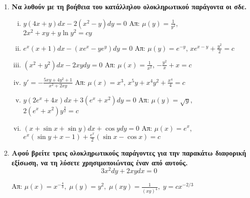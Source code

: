 \begin{enumerate}
  \item {\bfseries Να λυθούν με τη βοήθεια του κατάλληλου ολοκληρωτικού 
    παράγοντα οι σδε.}
    \begin{enumerate}[i)]
      \item $ y(4x+y)dx-2(x^{2}-y)dy=0 $ 
        \hfill Απ: $ \mu(y)= \frac{1}{y^{2}} $, $ 2x^{2}+xy+ y \ln{y^{2}} =cy$ 
      \item $ e^{x}(x+1)dx - (xe^{x}-ye^{y})dy = 0 $ 
        \hfill Απ: $ \mu(y) = e^{-y} $, $xe^{x-y} + \frac{y^{2}}{2} = c $
      \item $ (x^{2}+y^{2})dx - 2xydy = 0 $ 
        \hfill Απ: $ \mu(x)= \frac{1}{x^{2}} $, $ - \frac{y^{2}}{x} + x = c $
      \item $ y' =- \frac{5xy+4y^{2}+1}{x^{2}+2xy} $ 
        \hfill Απ: $ \mu(x)=x^{3} $, $ x^{5}y+x^{4}y^{2} + \frac{x^{4}}{4} = c $ 
      \item $ y(2e^{x}+4x)dx + 3(e^{x}+x^{2})dy = 0 $ 
        \hfill Απ: $ \mu(y)= \sqrt{ y } $, $ 2(e^{x}+x^{2})y^{\frac{3}{2}}=c $ 
      \item $ (x + \sin{x} + \sin{y})dx + \cos{y} dy =0 $ 
        \hfill Απ: $\mu(x)=e^{x} $, $ e^x(\sin{y} + x-1) + \frac{e^{x}}{2} 
        (\sin{x} - \cos{x})=c $
    \end{enumerate}

    \item {\bfseries Αφού βρείτε τρεις ολοκληρωτικούς παράγοντες για την 
      παρακάτω διαφορική εξίσωση, να τη λύσετε χρησιμοποιώντας έναν από αυτούς.}
      \[
        3x^{2}dy+2xydx=0 
      \] 

      \hfill Απ:  $ \mu (x) = x^{-\frac{4}{3}}, \; \mu (y) = y^{2}, \; \mu (xy) =
      \frac{1}{(xy)^{4}}, \; y=cx^{-2/3} $

      \end{enumerate}

        
